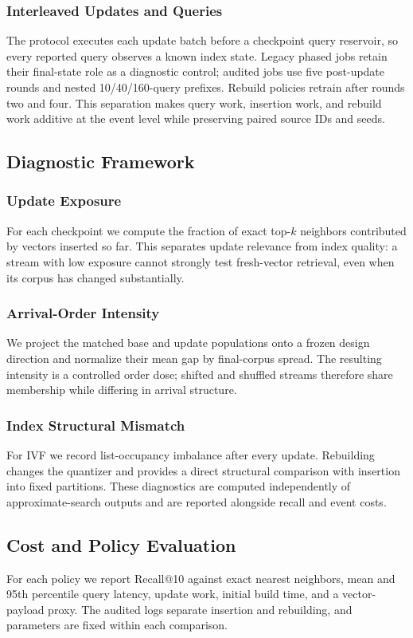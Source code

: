 \subsubsection{Interleaved Updates and Queries}
The protocol executes each update batch before a checkpoint query reservoir, so every
reported query observes a known index state. Legacy phased jobs retain their final-state
role as a diagnostic control; audited jobs use five post-update rounds and nested
10/40/160-query prefixes. Rebuild policies retrain after rounds two and four. This
separation makes query work, insertion work, and rebuild work additive at the event
level while preserving paired source IDs and seeds.

\subsection{Diagnostic Framework}
\subsubsection{Update Exposure}
For each checkpoint we compute the fraction of exact top-$k$ neighbors contributed by
vectors inserted so far. This separates update relevance from index quality: a stream
with low exposure cannot strongly test fresh-vector retrieval, even when its corpus has
changed substantially.

\subsubsection{Arrival-Order Intensity}
We project the matched base and update populations onto a frozen design direction and
normalize their mean gap by final-corpus spread. The resulting intensity is a controlled
order dose; shifted and shuffled streams therefore share membership while differing in
arrival structure.

\subsubsection{Index Structural Mismatch}
For IVF we record list-occupancy imbalance after every update. Rebuilding changes the
quantizer and provides a direct structural comparison with insertion into fixed
partitions. These diagnostics are computed independently of approximate-search outputs
and are reported alongside recall and event costs.

\subsection{Cost and Policy Evaluation}
For each policy we report Recall@10 against exact nearest neighbors, mean and 95th
percentile query latency, update work, initial build time, and a vector-payload proxy.
The audited logs separate insertion and rebuilding, and parameters are fixed within
each comparison.

